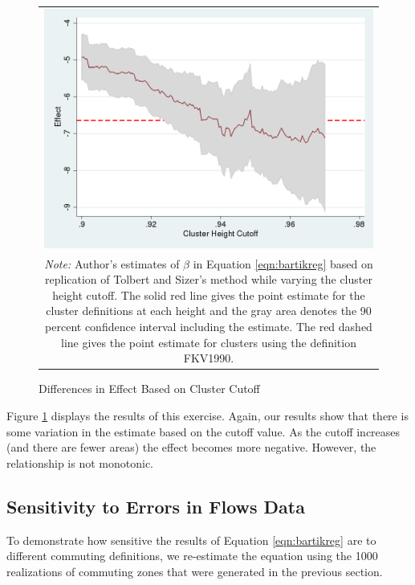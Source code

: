 \begin{figure}\centering
\caption{Differences in Effect Based on Cluster Cutoff \label{fig:cutoff_dist}}
\begin{tabular}{c}

\includegraphics[scale=.35]{./figures/cutoff_bartik.png} \\ 

\multicolumn{1}{p{6.5in}}{\footnotesize \emph{Note:} Author's estimates of $\beta$ in Equation \ref{eqn:bartikreg} based on replication of Tolbert and Sizer's method while varying the cluster height cutoff. The solid red line gives the point estimate for the cluster definitions at each height and the gray area denotes the 90 percent confidence interval including the estimate. The red dashed line gives the point estimate for clusters using the definition FKV1990.}
\end{tabular}
\end{figure}

Figure \ref{fig:cutoff_dist} displays the results of this exercise. Again, our results show that there is some variation in the estimate based on the cutoff value. As the cutoff increases (and there are fewer areas) the effect becomes more negative. However, the relationship is not monotonic.

\subsection{Sensitivity to Errors in Flows Data}

To demonstrate how sensitive the results of Equation \ref{eqn:bartikreg} are to different commuting definitions, we re-estimate the equation using the 1000 realizations of commuting zones that were generated in the previous section.

